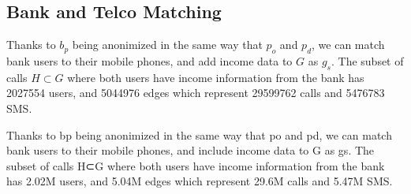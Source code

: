 \subsection{Bank and Telco Matching}

Thanks to \( b_p \) being anonimized in the same way that \( p_o \) and \( p_d \), we can match bank users to their mobile phones, and add income data to \( G \) as \( g_s \). The subset of calls \( H \subset G \) where both users have income information from the bank has \num{2027554} users, and \num{5044976} edges which represent \num{29599762} calls and \num{5476783} SMS.

\textcolor{'blue'}{Thanks to bp being anonimized in the same way that po and pd, we can match bank users to their mobile phones, and include income data to G as gs. The subset of calls H⊂G where both users have income information from the bank has 2.02M users, and 5.04M edges which represent 29.6M calls and 5.47M SMS.}